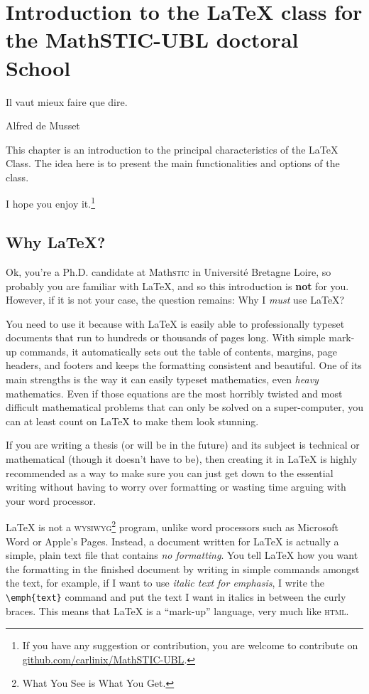 \chapter{Introduction to the \LaTeX{} class for the MathSTIC-UBL doctoral School}\label{chap:intro}

\epigraph{Il vaut mieux faire que dire.}{Alfred de Musset}
\minitoc%

This chapter is an introduction to the principal characteristics of the \urmstic{} \LaTeX{} Class. 
The idea here is to present the main functionalities and options of the class.


I hope you enjoy it.\footnote{If you have any suggestion or contribution, you are welcome to contribute on \url{github.com/carlinix/MathSTIC-UBL}.}

\section{Why \LaTeX?}\label{sec:why}
Ok, you're a Ph.D. candidate at Math\textsc{stic} in Université Bretagne Loire, so probably you are familiar with \LaTeX{}, and so this introduction is \textbf{not} for you.
However,  if it is not your case, the question remains: Why I \emph{must} use \LaTeX?

You need to use it because with \LaTeX{} is easily able to professionally typeset documents that run to hundreds or thousands of pages long. 
With simple mark-up commands, it automatically sets out the table of contents, margins, page headers, and footers and keeps the formatting consistent and beautiful. 
One of its main strengths is the way it can easily typeset mathematics, even \emph{heavy} mathematics. 
Even if those equations are the most horribly twisted and most difficult mathematical problems that can only be solved on a super-computer, you can at least count on \LaTeX{} to make them look stunning.

If you are writing a thesis (or will be in the future) and its subject is technical or mathematical (though it doesn't have to be), then creating it in \LaTeX{} is highly recommended as a way to make sure you can just get down to the essential writing without having to worry over formatting or wasting time arguing with your word processor.

\LaTeX{} is not a \textsc{wysiwyg}\footnote{What You See is What You Get.} program, unlike word processors such as Microsoft Word or Apple's Pages. 
Instead, a document written for \LaTeX{} is actually a simple, plain text file that contains \emph{no formatting}. 
You tell \LaTeX{} how you want the formatting in the finished document by writing in simple commands amongst the text, for example, if I want to use \emph{italic text for emphasis}, I write the \verb|\emph{text}| command and put the text I want in italics in between the curly braces. 
This means that \LaTeX{} is a \enquote{mark-up} language, very much like \textsc{html}.

